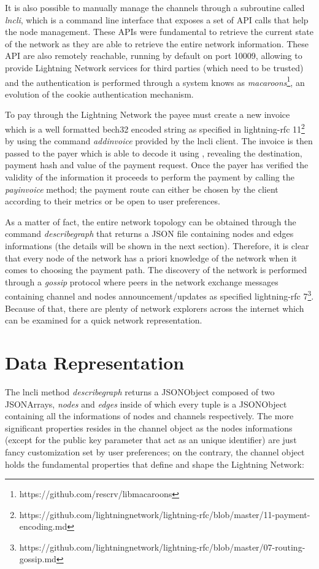 	It is also possible to manually manage the channels through a subroutine called \textit{lncli}, which is a command line interface that exposes a set of API calls that help the node management. These APIs were fundamental to retrieve the current state of the network as they are able to retrieve the entire network information. These API are also remotely reachable, running by default on port 10009, allowing to provide Lightning Network services for third parties (which need to be trusted) and the authentication is performed through a system knows as \textit{macaroons}\footnote{https://github.com/rescrv/libmacaroons}, an evolution of the cookie authentication mechanism. 
	
	To pay through the Lightning Network the payee must create a new invoice which is a well formatted bech32 encoded string as specified in lightning-rfc 11\footnote{https://github.com/lightningnetwork/lightning-rfc/blob/master/11-payment-encoding.md} by using the command \textit{addinvoice} provided by the lncli client. The invoice is then passed to the payer which is able to decode it using , revealing the destination, payment hash and value of the payment request. Once the payer has verified the validity of the information it proceeds to perform the payment by calling the \textit{payinvoice} method; the payment route can either be chosen by the client according to their metrics or be open to user preferences.	
	
	As a matter of fact, the entire network topology can be obtained through the command \textit{describegraph} that returns a JSON file containing nodes and edges informations (the details will be shown in the next section). Therefore, it is clear that every node of the network has a priori knowledge of the network when it comes to choosing the payment path. The discovery of the network is performed through a \textit{gossip} protocol where peers in the network exchange messages containing channel and nodes announcement/updates as specified lightning-rfc 7\footnote{https://github.com/lightningnetwork/lightning-rfc/blob/master/07-routing-gossip.md}. Because of that, there are plenty of network explorers across the internet which can be examined for a quick network representation.
	
	\section{Data Representation}
	
	The lncli method \textit{describegraph} returns a JSONObject composed of two JSONArrays, \textit{nodes} and \textit{edges} inside of which every tuple is a JSONObject containing all the informations of nodes and channels respectively. The more significant properties resides in the channel object as the nodes informations (except for the public key parameter that act as an unique identifier) are just fancy customization set by user preferences; on the contrary, the channel object holds the fundamental properties that define and shape  the Lightning Network:
	\newpage

